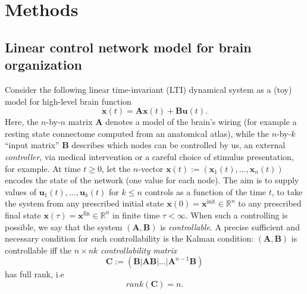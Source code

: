 \documentclass{article} %
\def\B#1{\bm{#1}}
\def\u{\mathbf{u}}
\def\A{\mathbf{A}}
\def\B{\mathbf{B}}
\def\C{\mathbf{C}}
\def\x{\mathbf{x}}
\begin{document}
\section{Methods}
\subsection{Linear control network model for brain organization}
Consider the following linear time-invariant (LTI) dynamical system as a (toy) model for high-level brain function
\begin{equation}
  \dot{\x}(t) = \A\x(t) + \B\u(t).
  \label{eq:lti}
\end{equation}
Here, the $n$-by-$n$ matrix $\A$ denotes a model of the brain's wiring (for example a resting state connectome computed from an anatomical atlas), while the $n$-by-$k$ ``input matrix'' $\B$ describes which nodes can be controlled by us, an external \textit{controller}, via medical intervention or a careful choice of stimulus presentation, for example.
At time $t \ge 0$, let  the $n$-vector  $\x(t) := (\x_1(t),\ldots,\x_n(t))$ encodes the state of the network (one value for each node). The aim is to supply values of $\u_1(t),\ldots,\u_k(t)$ for $k \le n$ controls as a function of the time $t$,  to take the system from any prescribed initial state $\x(0) = \x^{\text{init}} \in \mathbb R^n$ to any prescribed final state $\x(\tau) = \x^{\text{fin}} \in \mathbb R^n$ in finite time $\tau < \infty$.
When such a controlling is possible, we say that the system $(\A,\B)$ is \textit{controllable}. A precise sufficient and necessary condition for such controllability is the Kalman condition: $(\A,\B)$ is controllable iff the $n \times nk$ \textit{controllability matrix}
\begin{equation}
  \C := (\B|\A\B|\ldots|\A^{n-1}\B)
\end{equation}
has full rank, i.e
\begin{equation}
  rank(\C) = n.
\end{equation}
\end{document}
